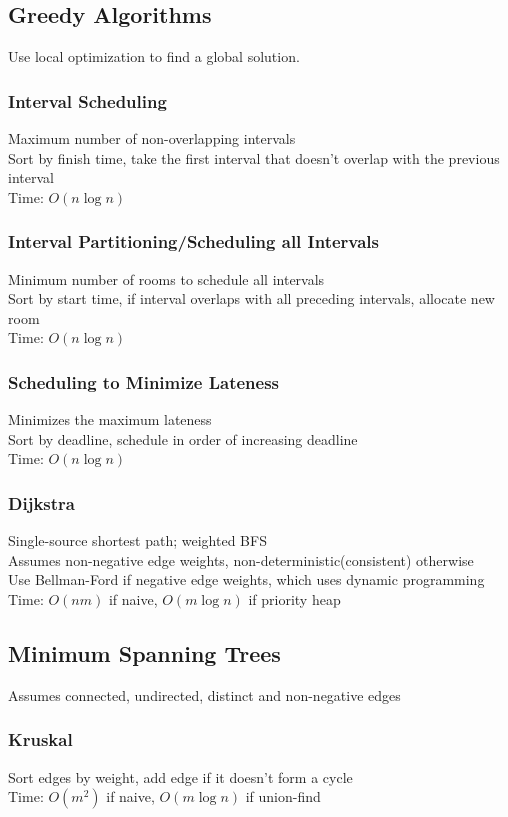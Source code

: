 \documentclass{article}
\begin{document}
\begin{multicols*}{2}
        \subsection*{Greedy Algorithms}
        Use local optimization to find a global solution.
        \subsubsection*{Interval Scheduling}
        Maximum number of non-overlapping intervals\\
        Sort by finish time, take the first interval that doesn't overlap
        with the previous interval\\
        Time: $O(n\log n)$
        \subsubsection*{Interval Partitioning/Scheduling all Intervals}
        Minimum number of rooms to schedule all intervals\\
        Sort by start time, if interval overlaps with all preceding intervals, allocate new room\\
        Time: $O(n\log n)$
        \subsubsection*{Scheduling to Minimize Lateness}
        Minimizes the maximum lateness\\
        Sort by deadline, schedule in order of increasing deadline\\
        Time: $O(n\log n)$
        \subsubsection*{Dijkstra}
        Single-source shortest path; weighted BFS\\
        Assumes non-negative edge weights, non-deterministic(consistent) otherwise\\
        Use Bellman-Ford if negative edge weights, which uses dynamic programming\\
        Time: $O(nm)$ if naive, $O(m\log n)$ if priority heap
        \subsection*{Minimum Spanning Trees}
        Assumes connected, undirected, distinct and non-negative edges
        \subsubsection*{Kruskal}
        Sort edges by weight, add edge if it doesn't form a cycle\\
        Time: $O(m^2)$ if naive, $O(m\log n)$ if union-find

\end{multicols*}
\end{document}
